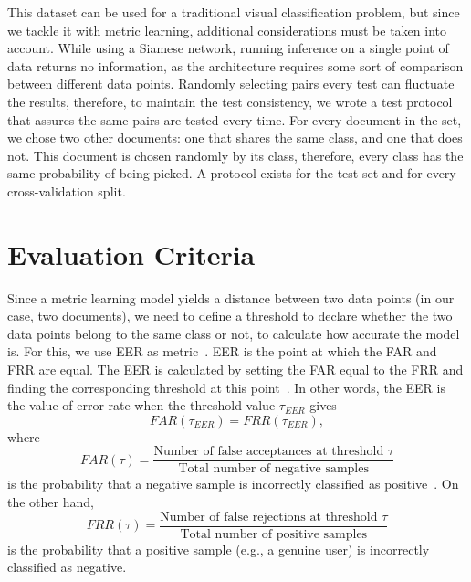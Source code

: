 This dataset can be used for a traditional visual classification problem, but since we tackle it with metric learning, additional considerations must be taken into account. While using a Siamese network, running inference on a single point of data returns no information, as the architecture requires some sort of comparison between different data points. Randomly selecting pairs every test can fluctuate the results, therefore, to maintain the test consistency, we wrote a test protocol that assures the same pairs are tested every time. For every document in the set, we chose two other documents: one that shares the same class, and one that does not. This document is chosen randomly by its class, therefore, every class has the same probability of being picked. A protocol exists for the test set and for every cross-validation split.


\section{Evaluation Criteria}
\label{sec:evaluation}

Since a metric learning model yields a distance between two data points (in our case, two documents), we need to define a threshold to declare whether the two data points belong to the same class or not, to calculate how accurate the model is. For this, we use \gls{EER} as metric~\cite{EER}. \gls{EER} is  the point at which the \gls{FAR} and \gls{FRR} are equal. The \gls{EER} is calculated by setting the \gls{FAR} equal to the \gls{FRR} and finding the corresponding threshold at this point~\cite{EER2}. In other words, the \gls{EER} is the value of error rate when the threshold value $\tau_{EER}$ gives 
\begin{equation}
    FAR(\tau_{EER}) = FRR(\tau_{EER}),
\end{equation}
where
\begin{equation} \label{far}
    FAR(\tau) = \frac{\text{Number of false acceptances at threshold~} \tau}{\text{Total number of negative samples}}
\end{equation}
is the probability that a negative sample is incorrectly classified as positive~\cite{EER3}. On the other hand,
\begin{equation} \label{frr}
    FRR(\tau) = \frac{\text{Number of false rejections at threshold~} \tau}{\text{Total number of positive samples}}
\end{equation}
is the probability that a positive sample (e.g., a genuine user) is incorrectly classified as negative.

